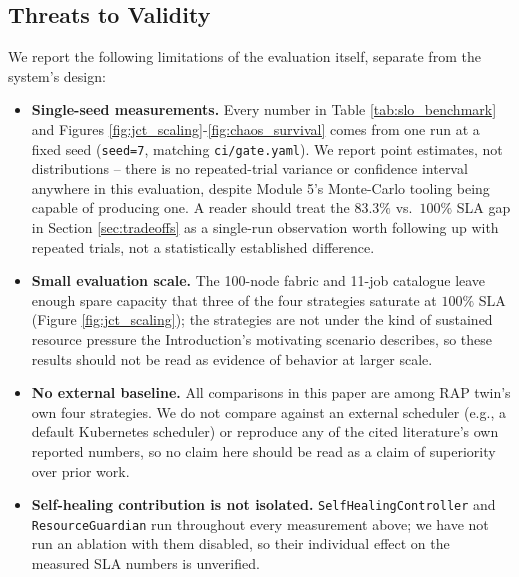 \documentclass[twoside,twocolumn,10pt]{article}
\begin{document}
\subsection{Threats to Validity}
\label{sec:threats}
We report the following limitations of the evaluation itself, separate from the system's design:
\begin{itemize}
    \item \textbf{Single-seed measurements.} Every number in Table \ref{tab:slo_benchmark} and Figures \ref{fig:jct_scaling}-\ref{fig:chaos_survival} comes from one run at a fixed seed (\texttt{seed=7}, matching \texttt{ci/gate.yaml}). We report point estimates, not distributions -- there is no repeated-trial variance or confidence interval anywhere in this evaluation, despite Module 5's Monte-Carlo tooling being capable of producing one. A reader should treat the $83.3\%$ vs.\ $100\%$ SLA gap in Section \ref{sec:tradeoffs} as a single-run observation worth following up with repeated trials, not a statistically established difference.
    \item \textbf{Small evaluation scale.} The 100-node fabric and 11-job catalogue leave enough spare capacity that three of the four strategies saturate at $100\%$ SLA (Figure \ref{fig:jct_scaling}); the strategies are not under the kind of sustained resource pressure the Introduction's motivating scenario describes, so these results should not be read as evidence of behavior at larger scale.
    \item \textbf{No external baseline.} All comparisons in this paper are among RAP twin's own four strategies. We do not compare against an external scheduler (e.g., a default Kubernetes scheduler) or reproduce any of the cited literature's own reported numbers, so no claim here should be read as a claim of superiority over prior work.
    \item \textbf{Self-healing contribution is not isolated.} \texttt{SelfHealingController} and \texttt{ResourceGuardian} run throughout every measurement above; we have not run an ablation with them disabled, so their individual effect on the measured SLA numbers is unverified.
\end{itemize}
\end{document}

